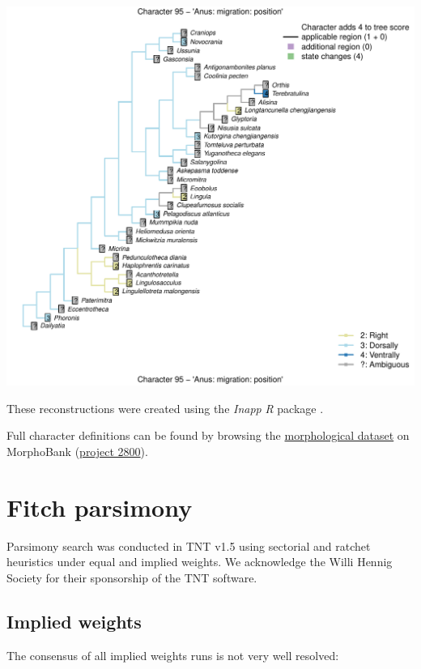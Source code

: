 \documentclass[]{book}
\theoremstyle{definition}
\theoremstyle{definition}
\theoremstyle{definition}
\theoremstyle{remark}
\begin{document}
\includegraphics{Brachiopod_phylogeny_files/figure-latex/unnamed-chunk-4-95.pdf}

These reconstructions were created using the \emph{Inapp} \emph{R}
package \citep{Brazeau2018}.

Full character definitions can be found by browsing the
\protect\hyperlink{dataset}{morphological dataset} on MorphoBank
(\href{https://morphobank.org/permalink/?P2800}{project 2800}).

\hypertarget{tnt}{%
\chapter{Fitch parsimony}\label{tnt}}

Parsimony search was conducted in TNT v1.5 \citep{Goloboff2016} using
sectorial and ratchet heuristics under equal and implied weights. We
acknowledge the Willi Hennig Society for their sponsorship of the TNT
software.

\hypertarget{implied-weights}{%
\section{Implied weights}\label{implied-weights}}

The consensus of all implied weights runs is not very well resolved:
\end{document}
